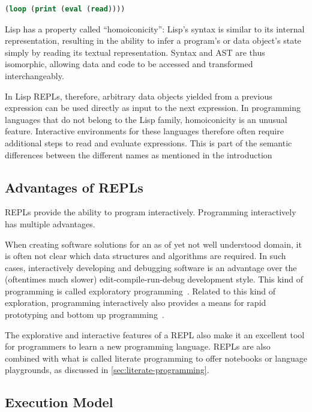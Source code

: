 \begin{lstlisting}[language=lisp]
(loop (print (eval (read))))
\end{lstlisting}

Lisp has a property called ``homoiconicity'': Lisp's syntax is similar to
its internal representation, resulting in the ability to infer a program's or
data object's state simply by reading its textual representation. Syntax and AST
are thus isomorphic, allowing data and code to be accessed and transformed
interchangeably.

In Lisp REPLs, therefore, arbitrary data objects yielded from a previous
expression can be used directly as input to the next expression. In programming
languages that do not belong to the Lisp family, homoiconicity is an unusual
feature. Interactive environments for these languages therefore often require
additional steps to read and evaluate expressions. This is part of the semantic
differences between the different names as mentioned in the introduction

\subsection{Advantages of REPLs}
\label{ssec:repl-advantages}

REPLs provide the ability to program interactively. Programming interactively
has multiple advantages.

When creating software solutions for an as of yet not well understood domain, it
is often not clear which data structures and algorithms are required. In such
cases, interactively developing and debugging software is an advantage over the
(oftentimes much slower) edit-compile-run-debug development style. This kind of
programming is called exploratory programming~\cite{Fritzson86}. Related to this
kind of exploration, programming interactively also provides a means for rapid
prototyping and bottom up programming~\cite{Graham93}.

The explorative and interactive features of a REPL also make it an excellent
tool for programmers to learn a new programming language. REPLs are also
combined with what is called literate programming to offer notebooks or language
playgrounds, as discussed in \cref{sec:literate-programming}.

\subsection{Execution Model}
\label{ssec:execution-model}

